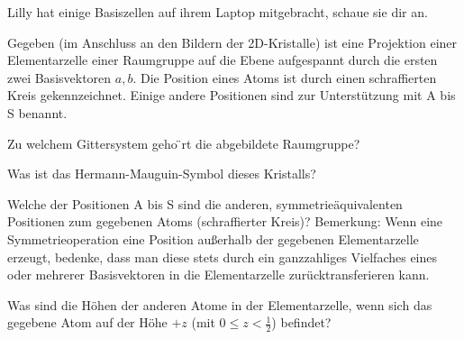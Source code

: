 \begin{sheet}
\begin{problem}
\end{problem}
\begin{problem}[difficulty={sehr leicht}]
	Lilly hat einige Basiszellen auf ihrem Laptop mitgebracht, schaue sie dir an.
\end{problem}



\begin{problem}
	Gegeben (im Anschluss an den Bildern der 2D-Kristalle) ist eine Projektion einer Elementarzelle einer Raumgruppe auf die Ebene aufgespannt durch die ersten zwei Basisvektoren $a,b$. Die Position eines Atoms ist durch einen schraffierten Kreis gekennzeichnet. Einige andere Positionen sind zur Unterstützung mit A bis S benannt.
	\begin{subproblem}
	Zu welchem Gittersystem geho ̈rt die abgebildete Raumgruppe?
	\end{subproblem}
	\begin{subproblem}
	Was ist das Hermann-Mauguin-Symbol dieses Kristalls?
	\end{subproblem}
	\begin{subproblem}
	Welche der Positionen A bis S sind die anderen, symmetrieäquivalenten Positionen zum gegebenen Atoms (schraffierter Kreis)?
	Bemerkung: Wenn eine Symmetrieoperation eine Position außerhalb der gegebenen Elementarzelle erzeugt, bedenke, dass man diese stets durch ein ganzzahliges Vielfaches eines oder mehrerer Basisvektoren in die Elementarzelle zurücktransferieren kann.
	\end{subproblem}
	\begin{subproblem}
		Was sind die Höhen der anderen Atome in der Elementarzelle, wenn sich das gegebene Atom auf der Höhe $+z$ (mit $0 \leq z < \frac{1}{2}$) befindet?
	\end{subproblem}
\begin{figure}

\end{figure}

\end{problem}

%

\end{sheet}